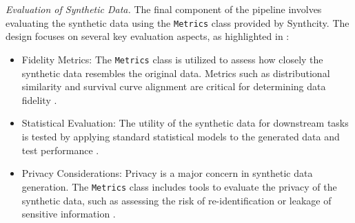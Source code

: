 \\\\
\noindent \textit{Evaluation of Synthetic Data.} The final component of the pipeline involves evaluating the synthetic data using the \texttt{Metrics} class provided by Synthcity. The design focuses on several key evaluation aspects, as highlighted in \parencite{morris_using_2019}:
\begin{itemize}
    \item Fidelity Metrics: The \texttt{Metrics} class is utilized to assess how closely the synthetic data resembles the original data. Metrics such as distributional similarity and survival curve alignment are critical for determining data fidelity \parencite{meng_simulating_2023}.
    \item Statistical Evaluation: The utility of the synthetic data for downstream tasks is tested by applying standard statistical models to the generated data and test performance \parencite{qi_effective_2023}. 
    \item Privacy Considerations: Privacy is a major concern in synthetic data generation. The \texttt{Metrics} class includes tools to evaluate the privacy of the synthetic data, such as assessing the risk of re-identification or leakage of sensitive information \parencite{wilkinson_fair_2016}. 
\end{itemize}

